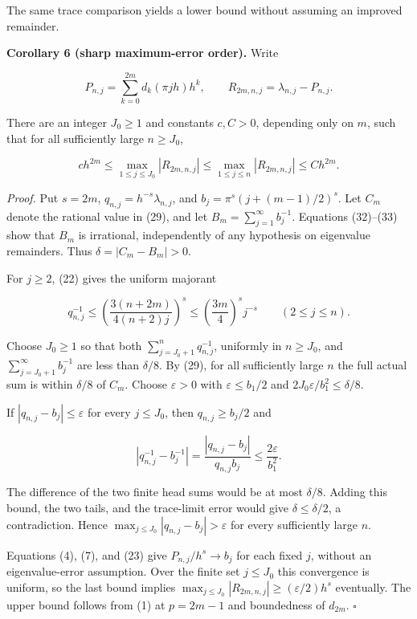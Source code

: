 \documentclass[10pt,a4paper]{article}
\begin{document}
The same trace comparison yields a lower bound without assuming an improved remainder.

\textbf{Corollary 6 (sharp maximum-error order).} Write

\nopagebreak[3]
\[
P_{n,j}=\sum_{k=0}^{2m}d_k(\pi jh)h^k,\qquad
R_{2m,n,j}=\lambda_{n,j}-P_{n,j}.
\]

There are an integer \(J_0\ge1\) and constants \(c,C>0\), depending only on \(m\), such that for all sufficiently large \(n\ge J_0\),

\nopagebreak[3]
\[
c h^{2m}\le
\max_{1\le j\le J_0}|R_{2m,n,j}|
\le\max_{1\le j\le n}|R_{2m,n,j}|
\le C h^{2m}.
\]

\emph{Proof.} Put \(s=2m\), \(q_{n,j}=h^{-s}\lambda_{n,j}\), and \(b_j=\pi^s(j+(m-1)/2)^s\). Let \(C_m\) denote the rational value in (29), and let \(B_m=\sum_{j=1}^\infty b_j^{-1}\). Equations (32)--(33) show that \(B_m\) is irrational, independently of any hypothesis on eigenvalue remainders. Thus \(\delta=|C_m-B_m|>0\).

For \(j\ge2\), (22) gives the uniform majorant

\nopagebreak[3]
\[
q_{n,j}^{-1}\le
\left(\frac{3(n+2m)}{4(n+2)j}\right)^s
\le\left(\frac{3m}{4}\right)^s j^{-s}
\qquad(2\le j\le n).
\]

Choose \(J_0\ge1\) so that both \(\sum_{j=J_0+1}^n q_{n,j}^{-1}\), uniformly in \(n\ge J_0\), and \(\sum_{j=J_0+1}^\infty b_j^{-1}\) are less than \(\delta/8\). By (29), for all sufficiently large \(n\) the full actual sum is within \(\delta/8\) of \(C_m\). Choose \(\varepsilon>0\) with \(\varepsilon\le b_1/2\) and \(2J_0\varepsilon/b_1^2\le\delta/8\).

If \(|q_{n,j}-b_j|\le\varepsilon\) for every \(j\le J_0\), then \(q_{n,j}\ge b_j/2\) and

\nopagebreak[3]
\[
|q_{n,j}^{-1}-b_j^{-1}|
=\frac{|q_{n,j}-b_j|}{q_{n,j}b_j}
\le\frac{2\varepsilon}{b_1^2}.
\]

The difference of the two finite head sums would be at most \(\delta/8\). Adding this bound, the two tails, and the trace-limit error would give \(\delta\le\delta/2\), a contradiction. Hence \(\max_{j\le J_0}|q_{n,j}-b_j|>\varepsilon\) for every sufficiently large \(n\).

Equations (4), (7), and (23) give \(P_{n,j}/h^s\to b_j\) for each fixed \(j\), without an eigenvalue-error assumption. Over the finite set \(j\le J_0\) this convergence is uniform, so the last bound implies \(\max_{j\le J_0}|R_{2m,n,j}|\ge(\varepsilon/2)h^s\) eventually. The upper bound follows from (1) at \(p=2m-1\) and boundedness of \(d_{2m}\). \(\square\)
\end{document}
